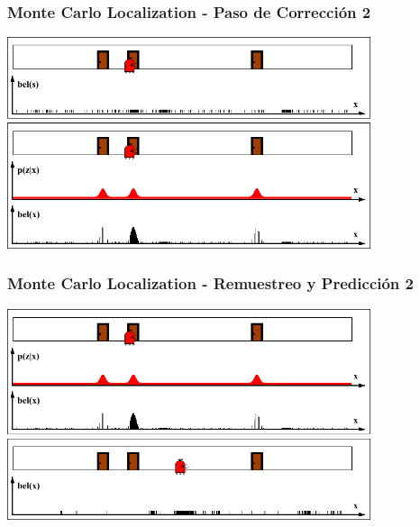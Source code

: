\begin{frame}
    \frametitle{Monte Carlo Localization - Paso de Corrección 2}

    \begin{center}
        \includegraphics[width=0.8\textwidth]{./images/particle_filter/monte_carlo_correction2.pdf}
    \end{center}

\end{frame}

\begin{frame}
    \frametitle{Monte Carlo Localization - Remuestreo y Predicción 2}

    \begin{center}
        \includegraphics[width=0.8\textwidth]{./images/particle_filter/monte_carlo_resample_and_predict2.pdf}
    \end{center}

\end{frame}



